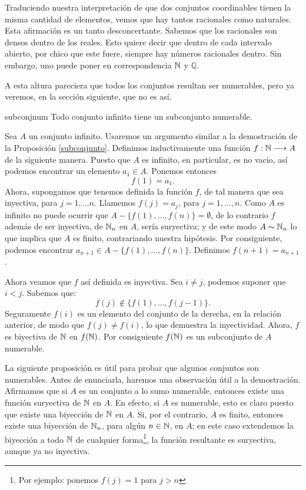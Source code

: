 Traduciendo nuestra interpretación de que dos conjuntos
coordinables tienen la misma cantidad de elementos, vemos que hay
tantos racionales como naturales. Esta afirmación es un tanto
desconcertante. Sabemos que los racionales son
densos dentro de los reales. Esto quiere decir que dentro de cada
intervalo abierto, por chico que este fuere, siempre hay números
racionales dentro. Sin embargo, uno puede poner en correspondencia
$\mathbb{N}$ y $\mathbb{Q}$.  

A esta altura pareciera que
todos los conjuntos resultan ser numerables, pero ya veremos, en
la sección siguiente, que no es así.


\begin{lema}{subconjnum} Todo conjunto infinito tiene un
subconjunto numerable.
\end{lema}

\begin{demo} Sea $A$ un conjunto infinito. Usaremos un argumento similar a la demostración de
la Proposición \vref{subconjunto}. Definimos inductivamente una
función $f:\mathbb{N}\longrightarrow A$  de la siguiente manera. Puesto
que $A$ es infinito, en particular, es no vacio, así podemos
encontrar un elemento $a_1\in A$. Ponemos entonces
\[f(1)=a_1.\]
Ahora, supongamos que tenemos definida la función $f$, de tal
manera que sea inyectiva, para $j=1,\dots n$. Llamemos $f(j)=a_j$,
para $j=1,\dots , n$. Como $A$ es infinito no puede ocurrir que
$A-\{f(1),\dots,f(n)\}=\emptyset$, de lo contrario $f$ además de
ser inyectiva, de $\mathbb{N}_n$ en $A$, sería suryectiva; y de este
modo $A\thicksim\mathbb{N}_n$ lo que implica que $A$ es finito,
contrariando nuestra hipótesis. Por consiguiente, podemos
encontrar $a_{n+1}\in A-\{f(1),\dots,f(n)\}$. Definimos
$f(n+1)=a_{n+1}$.

Ahora veamos que $f$ así definida es inyectiva. Sea $i\neq
j $, podemos suponer que $i<j$. Sabemos que:
\[f(j)\notin \{f(1),\dots,f(j-1)\}.\]
Seguramente $f(i)$ es un elemento del conjunto de la derecha, en
la relación anterior, de modo que $f(j)\neq f(i)$, lo que
demuestra la inyectividad. Ahora, $f$ es biyectiva de $\mathbb{N}$ en
$f(\mathbb{N})$. Por consiguiente $f(\mathbb{N})$ es un subconjunto de $A$
numerable. 
\end{demo}

La siguiente proposición es útil para probar que algunos
conjuntos son numerables. Antes de enunciarla, haremos una
observación útil a la demostración. Afirmamos que si $A$ es
un conjunto a lo sumo numerable, entonces existe una función
suryectiva de $\mathbb{N}$ en $A$. En efecto, si $A$ es numerable, esto
es claro puesto que existe una biyección de $\mathbb{N}$ en $A$. Si,
por el contrario, $A$ es finito, entonces existe una biyección
de $\mathbb{N}_n$, para algún $n\in\mathbb{N}$, en $A$; en este caso
extendemos la biyección a todo $\mathbb{N}$ de cualquier
forma\footnote{Por ejemplo: ponemos $f(j)=1$ para $j>n$}, la
función resultante es suryectiva, aunque ya no inyectiva.

